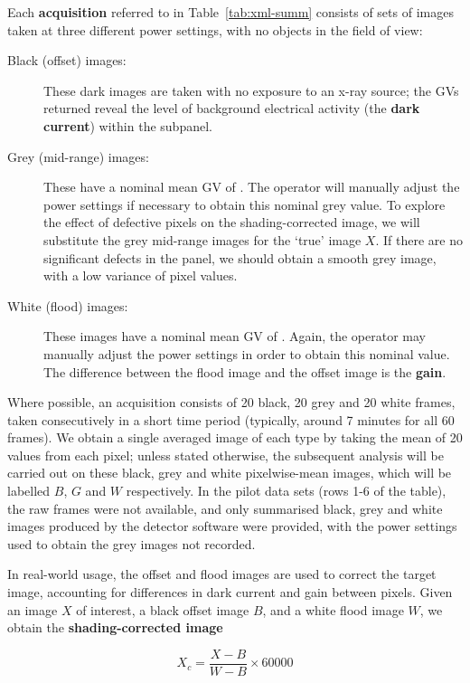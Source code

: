 \documentclass[\main/IO-Pixels.tex]{subfiles}
\begin{document}
Each \textbf{acquisition} referred to in Table~\ref{tab:xml-summ} consists of sets of images taken at three different power settings, with no objects in the field of view:
\begin{description}

\item[Black (offset) images:] These dark images are taken with no exposure to an x-ray source; the GVs returned reveal the level of background electrical activity (the \textbf{dark current}) within the subpanel.
\item[Grey (mid-range) images:] These have a nominal mean GV of . The operator will manually adjust the power settings if necessary to obtain this nominal grey value. To explore the effect of defective pixels on the shading-corrected image, we will substitute the grey mid-range images for the `true' image $X$. If there are no significant defects in the panel, we should obtain a smooth grey image, with a low variance of pixel values.
\item[White (flood) images:] These images have a nominal mean GV of . Again, the operator may manually adjust the power settings in order to obtain this nominal value. The difference between the flood image and the offset image is the \textbf{gain}.
\end{description}

Where possible, an acquisition consists of 20 black, 20 grey and 20 white frames, taken consecutively in a short time period (typically, around 7 minutes for all 60 frames). We obtain a single averaged image of each type by taking the mean of 20 values from each pixel; unless stated otherwise, the subsequent analysis will be carried out on these black, grey and white pixelwise-mean images, which will be labelled $B$, $G$ and $W$ respectively. In the pilot data sets (rows 1-6 of the table), the raw frames were not available, and only summarised black, grey and white images produced by the detector software were provided, with the power settings used to obtain the grey images not recorded.

In real-world usage, the offset and flood images are used to correct the target image, accounting for differences in dark current and gain between pixels. Given an image $X$ of interest, a black offset image $B$, and a white flood image $W$, we obtain the \textbf{shading-corrected image}

\begin{equation}
	X_c = \frac{X -B}{W - B} \times 60000
\end{equation}
\end{document}
